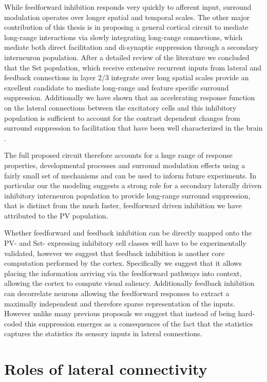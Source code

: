 While feedforward inhibition responds very quickly to afferent input,
surround modulation operates over longer spatial and temporal
scales. The other major contribution of this thesis is in proposing a
general cortical circuit to mediate long-range interactions via slowly
integrating long-range connections, which mediate both direct
facilitation and di-synaptic suppression through a secondary
interneuron population. After a detailed review of the literature we
concluded that the Sst population, which receive extensive recurrent
inputs from lateral and feedback connections in layer 2/3 integrate
over long spatial scales \citep{Xu2009, Adesnik2012, Nienborg2013}
provide an excellent candidate to mediate long-range and feature
specific surround suppression. Additionally we have shown that an
accelerating response function on the lateral connections between the
excitatory cells and this inhibitory population is sufficient to
account for the contrast dependent changes from surround suppression
to facilitation that have been well characterized in the brain
\citep{Levitt1997, Polat1998, Dragoi2000, Wang2009}.

The full proposed circuit therefore accounts for a huge range of
response properties, developmental processes and surround modulation
effects using a fairly small set of mechanisms and can be used to
inform future experiments. In particular our the modeling suggests a
strong role for a secondary laterally driven inhibitory interneuron
population to provide long-range surround suppression, that is
distinct from the much faster, feedforward driven inhibition we have
attributed to the PV population.

Whether feedforward and feedback inhibition can be directly mapped
onto the PV- and Sst- expressing inhibitory cell classes will have to
be experimentally validated, however we suggest that feedback
inhibition is another core computation performed by the
cortex. Specifically we suggest that it allows placing the information
arriving via the feedforward pathways into context, allowing the
cortex to compute visual saliency. Additionally feedback inhibition
can decorrelate neurons allowing the feedforward responses to extract
a maximally independent and therefore sparse representation of the
inputs. However unlike many previous proposals we suggest that instead
of being hard-coded this suppression emerges as a consequences of the
fact that the statistics captures the statistics its sensory inputs in
lateral connections.

\section{Roles of lateral connectivity}

